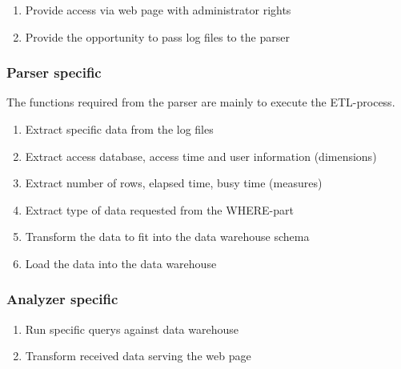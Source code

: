 \begin{enumerate}[resume*=func]
  
  \item Provide access via web page with administrator rights\label{f15}
   
  \item Provide the opportunity to pass \glspl{log file} to the \gls{parser} \label{f16}
   
\end{enumerate}


\subsubsection*{Parser specific}
 The functions required from the \gls{parser} are mainly to execute the \gls{ETL-process}. 
 
\begin{enumerate}[resume*=func]
  
  \item Extract specific data from the \glspl{log file} \label{p1}
  
  \item Extract access \gls{database}, access time and user information (\glspl{dimension})\label{p2} %
  
  \item Extract number of \glspl{row}, \gls{elapsed time}, \gls{busy time} (\glspl{measure})\label{f17} %
  
  \item Extract type of data requested from the \gls{WHERE-part}\label{p4} %
  
  \item Transform the data to fit into the \gls{data warehouse} schema\label{f18}
  
  \item Load the data into the \gls{data warehouse} \label{f19}

\end{enumerate}

\subsubsection*{Analyzer specific}
 
\begin{enumerate}[resume*=func]
  
  \item Run specific \glspl{query} against \gls{data warehouse} \label{f20}
  
  \item Transform received data serving the web page \label{f21}

\end{enumerate}


